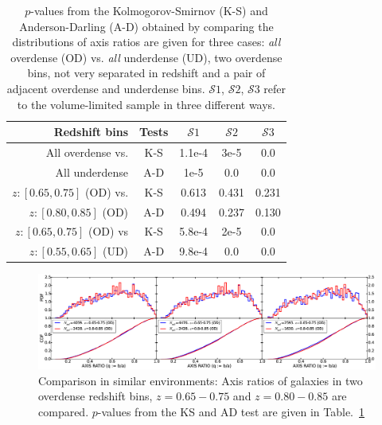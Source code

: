\documentclass[twocolumn,useAMS,usenatbib]{mn2e}
\newcommand{\s}{\ensuremath{\mathcal{S}}}
\begin{document}
\begin{table}
 \centering
 \begin{tabular}[\columnwidth]{ | r | c | c | c | c | }
  \hline
  Redshift bins & Tests & \s$1$ & \s$2$ & \s$3$ \\
  \hline
  All overdense vs. & K-S & 1.1e-4 & 3e-5 & 0.0 \\
  All underdense    & A-D & 1e-5 & 0.0 & 0.0 \\ \hline 
  $z:[0.65,0.75]$ (OD) vs. & K-S & 0.613 & 0.431 & 0.231 \\
  $z:[0.80,0.85]$ (OD) & A-D & 0.494 & 0.237 & 0.130 \\ \hline
  $z:[0.65,0.75]$ (OD) vs & K-S & 5.8e-4 & 2e-5 & 0.0 \\
  $z:[0.55,0.65]$ (UD) & A-D & 9.8e-4 & 0.0 & 0.0 \\ \hline
 \end{tabular}
 \caption{$p$-values from the Kolmogorov-Smirnov (K-S) and Anderson-Darling (A-D) obtained by comparing the distributions of axis ratios are given for three cases: \emph{all} overdense (OD) vs. \emph{all} underdense (UD), two overdense bins, not very separated in redshift and a pair of adjacent overdense and underdense bins. \s$1$, \s$2$, \s$3$ refer to the volume-limited sample in three different ways.}
 \label{table:pvalues_all}
\end{table}

\begin{figure}
 \centering
 \includegraphics[width=2.3\columnwidth]{axis_ratio_odod}
 \caption{Comparison in similar environments: Axis ratios of galaxies in two overdense redshift bins, $z=0.65-0.75$ and $z=0.80-0.85$ are compared. $p$-values from the KS and AD test are given in Table.~\ref{table:pvalues_all}}
 \label{fig:axisratio_similar}
\end{figure}
\end{document}
